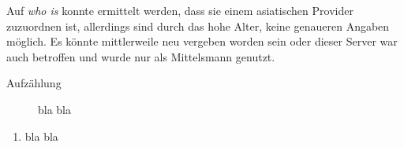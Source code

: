 Auf \textit{who is} konnte ermittelt werden, dass sie einem asiatischen Provider zuzuordnen ist, allerdings sind durch das hohe Alter, keine genaueren Angaben möglich. Es könnte mittlerweile neu vergeben worden sein oder dieser Server war auch betroffen und wurde nur als Mittelsmann genutzt.


\begin{description}
	\item[Aufzählung] bla bla
\end{description}

\begin{enumerate}
	\item bla bla 
\end{enumerate}


